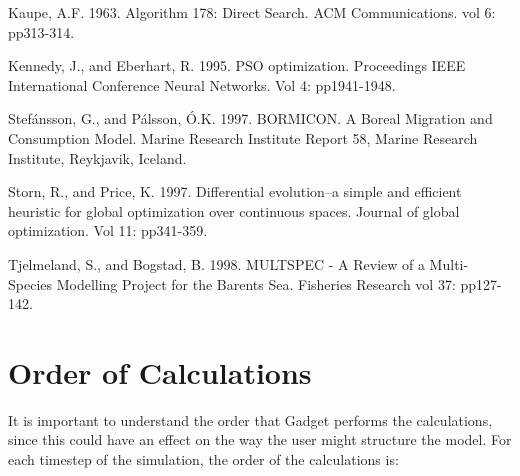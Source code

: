 \documentclass[10pt,twoside]{book}
\begin{document}
Kaupe, A.F. 1963. Algorithm 178: Direct Search. ACM Communications. vol 6: pp313-314.\newline

Kennedy, J., and Eberhart, R. 1995. PSO optimization. Proceedings IEEE International Conference Neural Networks. Vol 4: pp1941-1948.\newline

Stef\'{a}nsson, G., and P\'{a}lsson, \'{O}.K. 1997. BORMICON. A Boreal Migration and Consumption Model. Marine Research Institute Report 58, Marine Research Institute, Reykjavik, Iceland.\newline

Storn, R., and Price, K. 1997. Differential evolution--a simple and efficient heuristic for global optimization over continuous spaces. Journal of global optimization. Vol 11: pp341-359. \newline

Tjelmeland, S., and Bogstad, B. 1998. MULTSPEC - A Review of a Multi-Species Modelling Project for the Barents Sea. Fisheries Research vol 37: pp127-142.\newline

\appendix
\chapter{Order of Calculations}\label{chap:order}
It is important to understand the order that Gadget performs the calculations, since this could have an effect on the way the user might structure the model.  For each timestep of the simulation, the order of the calculations is:
\end{document}
